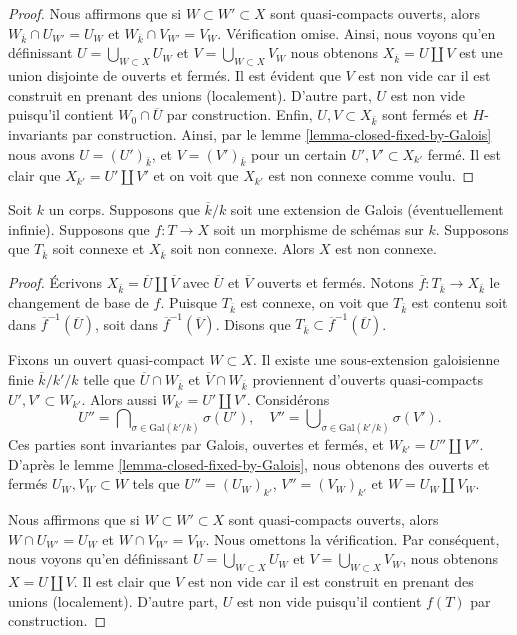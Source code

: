 \begin{proof}
\medskip\noindent
Nous affirmons que si $W \subset W' \subset X$ sont
quasi-compacts ouverts, alors $W_{\overline{k}} \cap U_{W'}
= U_W$ et $W_{\overline{k}} \cap V_{W'} = V_W$. Vérification
omise. Ainsi, nous voyons qu'en définissant $U = \bigcup_{W
\subset X} U_W$ et $V = \bigcup_{W \subset X} V_W$ nous
obtenons $X_{\overline{k}} = U \amalg V$ est une union
disjointe de ouverts et fermés. Il est évident que $V$ est
non vide car il est construit en prenant des unions
(localement). D'autre part, $U$ est non vide puisqu'il contient
$W_0 \cap \overline{U}$ par construction. Enfin, $U, V \subset
X_{\bar k}$ sont fermés et $H$-invariants par construction.
Ainsi, par le lemme \ref{lemma-closed-fixed-by-Galois} nous
avons $U = (U')_{\bar k}$, et $V = (V')_{\bar k}$ pour un certain
$U', V' \subset X_{k'}$ fermé. Il est clair que $X_{k'} = U'
\amalg V'$ et on voit que $X_{k'}$ est non connexe comme voulu.
\end{proof}

\begin{lemma}
\label{lemma-tricky}
Soit $k$ un corps. Supposons que $\overline{k}/k$ soit une
extension de Galois (éventuellement infinie). Supposons que $f : T \to X$
soit un morphisme de schémas sur $k$. Supposons que $T_{\overline{k}}$
soit connexe et $X_{\overline{k}}$ soit non connexe. Alors $X$ est non connexe.
\end{lemma}

\begin{proof}
Écrivons $X_{\overline{k}} = \overline{U} \amalg \overline{V}$
avec $\overline{U}$ et $\overline{V}$ ouverts et fermés. Notons
$\overline{f} : T_{\overline{k}} \to X_{\overline{k}}$ le
changement de base de $f$. Puisque $T_{\overline{k}}$ est connexe,
on voit que $T_{\overline{k}}$ est contenu soit dans
$\overline{f}^{-1}(\overline{U})$, soit dans
$\overline{f}^{-1}(\overline{V})$. Disons que $T_{\overline{k}} \subset \overline{f}^{-1}(\overline{U})$.

\medskip\noindent
Fixons un ouvert quasi-compact $W \subset X$. Il
existe une sous-extension galoisienne finie
$\overline{k}/k'/k$ telle que $\overline{U} \cap
W_{\overline{k}}$ et $\overline{V} \cap
W_{\overline{k}}$ proviennent d'ouverts quasi-compacts $U', V'
\subset W_{k'}$. Alors aussi $W_{k'} = U' \amalg V'$. Considérons
$$
U'' = \bigcap\nolimits_{\sigma \in \text{Gal}(k'/k)} \sigma(U'),
\quad
V'' = \bigcup\nolimits_{\sigma \in \text{Gal}(k'/k)} \sigma(V').
$$
Ces parties sont invariantes par Galois, ouvertes et
fermés, et $W_{k'} = U'' \amalg V''$.
D'après le lemme
\ref{lemma-closed-fixed-by-Galois}, nous obtenons des
ouverts et fermés $U_W, V_W \subset W$ tels que $U'' =
(U_W)_{k'}$, $V'' = (V_W)_{k'}$ et $W = U_W \amalg V_W$.

\medskip\noindent
Nous affirmons que si $W \subset W' \subset X$ sont
quasi-compacts ouverts, alors $W \cap U_{W'} = U_W$ et $W
\cap V_{W'} = V_W$. Nous omettons la vérification. Par conséquent,
nous voyons qu'en définissant $U = \bigcup_{W \subset X}
U_W$ et $V = \bigcup_{W \subset X} V_W$, nous obtenons $X =
U \amalg V$. Il est clair que $V$ est non vide car il est
construit en prenant des unions (localement). D'autre part,
$U$ est non vide puisqu'il contient $f(T)$ par construction.
\end{proof}

